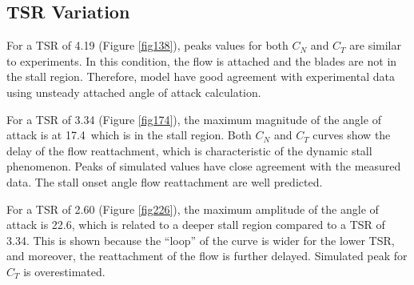 \documentclass[a4paper]{jpconf}
\begin{document}
\subsection{TSR Variation}

For a TSR of 4.19 (Figure \ref{fig138}), peaks values for both $C_N$ and $C_T$ are similar to experiments. In this condition, the flow is attached and the blades are not in the stall region. Therefore, model have good agreement with experimental data using unsteady attached angle of attack calculation.

For a TSR of 3.34 (Figure \ref{fig174}), the maximum magnitude of the angle of attack is at
17.4\degree\ which is in the stall region. Both $C_N$ and $C_T$ curves show the delay
of the flow reattachment, which is characteristic of the dynamic stall
phenomenon. Peaks of simulated values have close agreement with the measured
data. The stall onset angle flow reattachment are well predicted.

For a TSR of 2.60 (Figure \ref{fig226}), the maximum amplitude of the angle of attack is 22.6\degree, which
is related to a deeper stall region compared to a TSR of 3.34. This is shown
because the ``loop'' of the curve is wider for the lower TSR, and moreover, the
reattachment of the flow is further delayed. Simulated peak for $C_T$ is overestimated. 
\end{document}
